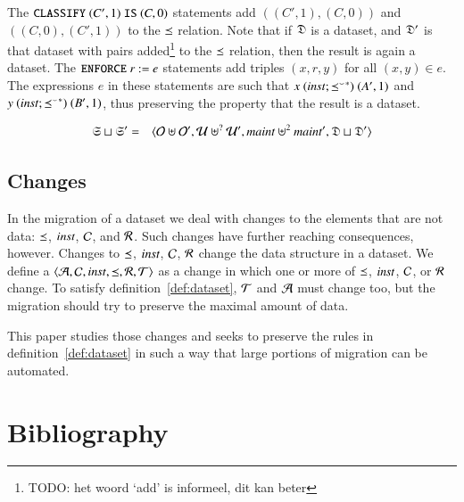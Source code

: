 \documentclass{elsarticle}
\begin{document}
The ${\tt CLASSIFY\ }(C',1){\tt\ IS\ }(C,0)$ statements add $((C',1),(C,0))$ and  $((C,0),(C',1))$ to the $\preceq$ relation. Note that if $\mathfrak{D}$ is a dataset, and $\mathfrak{D}'$ is that dataset with pairs added\footnote{TODO: het woord `add' is informeel, dit kan beter} to the $\preceq$ relation, then the result is again a dataset.
The ${\tt ENFORCE\ }r{\tt\ :=\ }e$ statements add triples $(x,r,y)$ for all $(x,y)\in e$.
The expressions $e$ in these statements are such that $x\ (\text{\it inst\/} ; {{\preceq}^\smallsmile}^*)\ (A',1)$ and $y \ (\inst \compose \kleenestar{\flip{\isa}})\ (B',1)$, thus preserving the property that the result is a dataset.

\begin{definition}
	\begin{eqnarray}
		\mathfrak{S}\sqcup\mathfrak{S}'&=&\langle\mathcal{O}\uplus\mathcal{O}',\mathcal{U}\uplus^?\mathcal{U}',\text{\it maint\/}\uplus^2\text{\it maint\/}',\mathfrak{D}\sqcup\mathfrak{D}'\rangle
	\end{eqnarray}
\end{definition}

\subsection{Changes}
	In the migration of a dataset we deal with changes to the elements that are not data:
	$\preceq$, $\text{\it inst\/}$, $\mathcal{C}$, and $\mathcal{R}$.
	Such changes have further reaching consequences, however.
	Changes to $\preceq$, $\text{\it inst\/}$, $\mathcal{C}$, $\mathcal{R}$ change the data structure in a dataset.
	We define a  $\langle\mathcal{A},\mathcal{C},\text{\it inst\/},\preceq,\mathcal{R},\mathcal{T}\rangle$ as a change in which one or more of $\preceq$, $\text{\it inst\/}$, $\mathcal{C}$, or $\mathcal{R}$ change.
	To satisfy definition~\ref{def:dataset}, $\mathcal{T}$ and $\mathcal{A}$ must change too,
	but the migration should try to preserve the maximal amount of data.

	This paper studies those changes and seeks to preserve the rules in definition~\ref{def:dataset}
	in such a way that large portions of migration can be automated.


\section{Bibliography}


\end{document}

